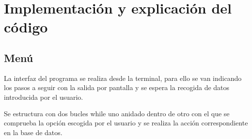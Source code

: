 \chapter{Implementación y explicación del código}

\section{Menú}

La interfaz del programa se realiza desde la terminal, para ello se van indicando los pasos a seguir con la salida por pantalla y se espera la recogida de datos introducida por el usuario.

Se estructura con dos bucles while uno anidado dentro de otro con el que se comprueba la opción escogida por el usuario y se realiza la acción correspondiente en la base de datos. 

